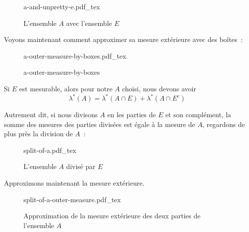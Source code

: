 \documentclass[a4paper]{article}
\newcommand{\incfig}[1]{%
    \def\svgwidth{\columnwidth}
    {#1.pdf_tex}
}
\begin{document}
\begin{figure}[H]
    
    \centering
    \incfig{a-and-unpretty-e}
    \caption{L'ensemble $A$ avec l'ensemble $E$}
    \label{fig:a-and-unpretty-e}
\end{figure}%
Voyons maintenant comment approximer sa mesure extérieure avec des boîtes :%
\begin{figure}[H]
    
    
    
    \centering
    \incfig{a-outer-measure-by-boxes}
    \caption{a-outer-measure-by-boxes}
    \label{fig:a-outer-measure-by-boxes}
\end{figure}%


Si $E$ est mesurable, alors pour notre $A$ choisi, nous devons avoir
 \[
\lambda^*(A) = \lambda^*(A \cap E) + \lambda^*(A \cap E^c)
\] 

Autrement dit, si nous divisons $A$ en les parties de $E$ et son complément, la somme des mesures des parties divisées est égale à la mesure de $A$, regardons de plus près la division de $A$ :
\begin{figure}[H]
    
    
    
    \centering
    \incfig{split-of-a}
    \caption{L'ensemble $A$ divisé par $E$}
    \label{fig:split-of-a}
\end{figure}%


Approximons maintenant la mesure extérieure.

\begin{figure}[H]
    
    \centering
    \incfig{split-of-a-outer-measure}
    \caption{Approximation de la mesure extérieure des deux parties de l'ensemble $A$}
    \label{fig:split-of-a-outer-measure}
\end{figure}%
\end{document}
